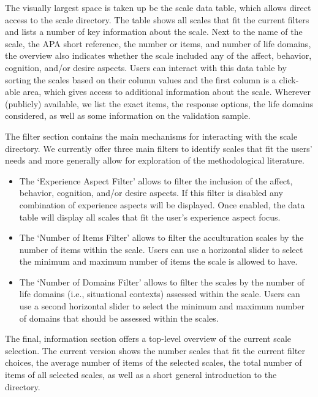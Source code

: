 \documentclass[man, 12pt, a4paper]{apa7}
\begin{document}
The visually largest space is taken up be the scale data table, which allows direct access to the scale directory. The table shows all scales that fit the current filters and lists a number of key information about the scale. Next to the name of the scale, the APA short reference, the number or items, and number of life domains, the overview also indicates whether the scale included any of the affect, behavior, cognition, and/or desire aspects. Users can interact with this data table by sorting the scales based on their column values and the first column is a click-able area, which gives access to additional information about the scale. Wherever (publicly) available, we list the exact items, the response options, the life domains considered, as well as some information on the validation sample.

The filter section contains the main mechanisms for interacting with the scale directory. We currently offer three main filters to identify scales that fit the users' needs and more generally allow for exploration of the methodological literature.
\begin{itemize}
\item The `Experience Aspect Filter' allows to filter the inclusion of the affect, behavior, cognition, and/or desire aspects. If this filter is disabled any combination of experience aspects will be displayed. Once enabled, the data table will display all scales that fit the user's experience aspect focus.
\item The `Number of Items Filter' allows to filter the acculturation scales by the number of items within the scale. Users can use a horizontal slider to select the minimum and maximum number of items the scale is allowed to have.
\item The `Number of Domains Filter' allows to filter the scales by the number of life domains (i.e., situational contexts) assessed within the scale. Users can use a second horizontal slider to select the minimum and maximum number of domains that should be assessed within the scales.
\end{itemize}

The final, information section offers a top-level overview of the current scale selection. The current version shows the number scales that fit the current filter choices, the average number of items of the selected scales, the total number of items of all selected scales, as well as a short general introduction to the directory.

\printbibliography
\end{document}
